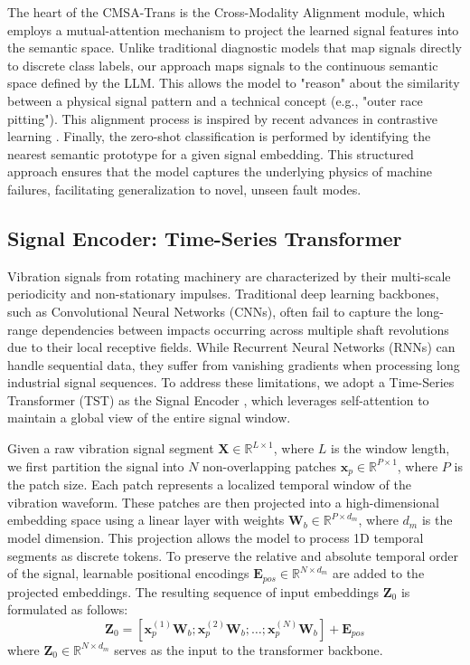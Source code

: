 \documentclass[journal]{IEEEtran}
\begin{document}
The heart of the CMSA-Trans is the Cross-Modality Alignment module, which employs a mutual-attention mechanism to project the learned signal features into the semantic space. Unlike traditional diagnostic models that map signals directly to discrete class labels, our approach maps signals to the continuous semantic space defined by the LLM. This allows the model to "reason" about the similarity between a physical signal pattern and a technical concept (e.g., "outer race pitting"). This alignment process is inspired by recent advances in contrastive learning \cite{radford2021learning, oord2018representation, chen2020simple}. Finally, the zero-shot classification is performed by identifying the nearest semantic prototype for a given signal embedding. This structured approach ensures that the model captures the underlying physics of machine failures, facilitating generalization to novel, unseen fault modes.

\subsection{Signal Encoder: Time-Series Transformer}
Vibration signals from rotating machinery are characterized by their multi-scale periodicity and non-stationary impulses. Traditional deep learning backbones, such as Convolutional Neural Networks (CNNs), often fail to capture the long-range dependencies between impacts occurring across multiple shaft revolutions due to their local receptive fields. While Recurrent Neural Networks (RNNs) can handle sequential data, they suffer from vanishing gradients when processing long industrial signal sequences. To address these limitations, we adopt a Time-Series Transformer (TST) as the Signal Encoder \cite{zerveas2021transformer}, which leverages self-attention to maintain a global view of the entire signal window.

Given a raw vibration signal segment $\mathbf{X} \in \mathbb{R}^{L \times 1}$, where $L$ is the window length, we first partition the signal into $N$ non-overlapping patches $\mathbf{x}_p \in \mathbb{R}^{P \times 1}$, where $P$ is the patch size. Each patch represents a localized temporal window of the vibration waveform. These patches are then projected into a high-dimensional embedding space using a linear layer with weights $\mathbf{W}_b \in \mathbb{R}^{P \times d_m}$, where $d_m$ is the model dimension. This projection allows the model to process 1D temporal segments as discrete tokens. To preserve the relative and absolute temporal order of the signal, learnable positional encodings $\mathbf{E}_{pos} \in \mathbb{R}^{N \times d_m}$ are added to the projected embeddings. The resulting sequence of input embeddings $\mathbf{Z}_0$ is formulated as follows:
\begin{equation}
\mathbf{Z}_0 = [\mathbf{x}_p^{(1)}\mathbf{W}_b; \mathbf{x}_p^{(2)}\mathbf{W}_b; \dots; \mathbf{x}_p^{(N)}\mathbf{W}_b] + \mathbf{E}_{pos}
\end{equation}
where $\mathbf{Z}_0 \in \mathbb{R}^{N \times d_m}$ serves as the input to the transformer backbone.
\end{document}
